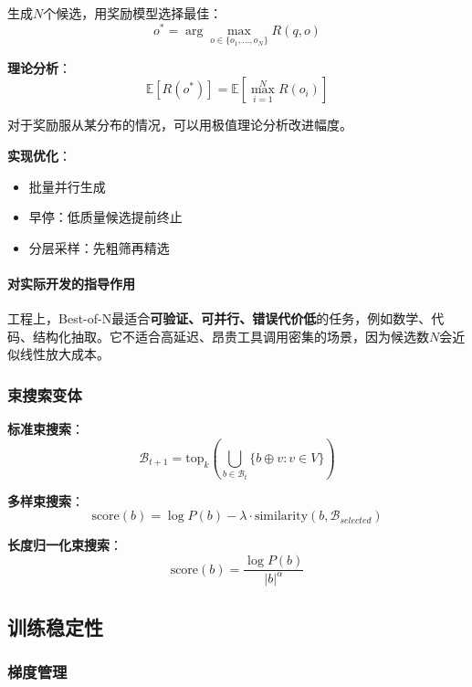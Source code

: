 \documentclass[12pt,a4paper]{article}
\begin{document}
生成$N$个候选，用奖励模型选择最佳：
\begin{equation}
o^* = \arg\max_{o \in \{o_1, \ldots, o_N\}} R(q, o)
\end{equation}

\textbf{理论分析}：
\begin{equation}
\mathbb{E}[R(o^*)] = \mathbb{E}\left[\max_{i=1}^N R(o_i)\right]
\end{equation}

对于奖励服从某分布的情况，可以用极值理论分析改进幅度。

\textbf{实现优化}：
\begin{itemize}
    \item 批量并行生成
    \item 早停：低质量候选提前终止
    \item 分层采样：先粗筛再精选
\end{itemize}
\paragraph{对实际开发的指导作用}

工程上，Best-of-N最适合\textbf{可验证、可并行、错误代价低}的任务，例如数学、代码、结构化抽取。它不适合高延迟、昂贵工具调用密集的场景，因为候选数$N$会近似线性放大成本。

\subsubsection{束搜索变体}

\textbf{标准束搜索}：
\begin{equation}
\mathcal{B}_{t+1} = \text{top}_k\left(\bigcup_{b \in \mathcal{B}_t} \{b \oplus v : v \in V\}\right)
\end{equation}

\textbf{多样束搜索}：
\begin{equation}
\text{score}(b) = \log P(b) - \lambda \cdot \text{similarity}(b, \mathcal{B}_{selected})
\end{equation}

\textbf{长度归一化束搜索}：
\begin{equation}
\text{score}(b) = \frac{\log P(b)}{|b|^\alpha}
\end{equation}

\subsection{训练稳定性}

\subsubsection{梯度管理}
\end{document}
